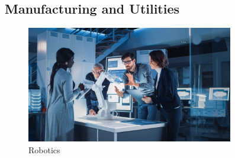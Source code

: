 \subsection{Manufacturing and Utilities}

\begin{figure}[H]
	\begin{center}
		\caption{Robotics}
		\vskip 4pt
		\includegraphics[height=2in]{images/careers/iStock-1214111404.small.jpg}
	\end{center}
\end{figure}

